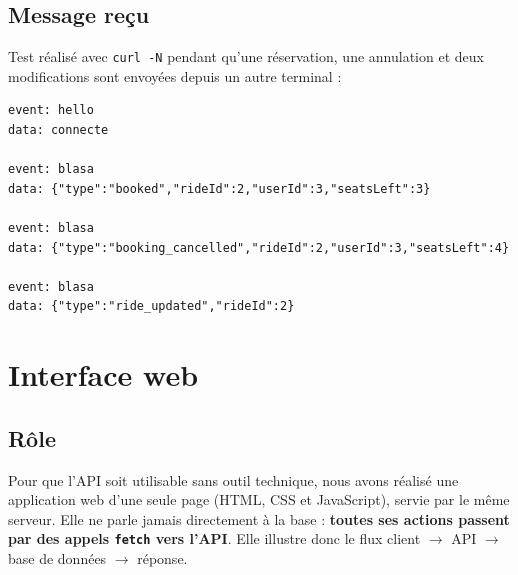 \documentclass[11pt,a4paper]{article}
\begin{document}
\subsection{Message re\c cu}
Test r\'ealis\'e avec \texttt{curl -N} pendant qu'une r\'eservation, une annulation et deux modifications sont envoy\'ees depuis un autre terminal :
\begin{lstlisting}
event: hello
data: connecte

event: blasa
data: {"type":"booked","rideId":2,"userId":3,"seatsLeft":3}

event: blasa
data: {"type":"booking_cancelled","rideId":2,"userId":3,"seatsLeft":4}

event: blasa
data: {"type":"ride_updated","rideId":2}
\end{lstlisting}

\section{Interface web}

\subsection{R\^ole}
Pour que l'API soit utilisable sans outil technique, nous avons r\'ealis\'e une application web d'une seule page (HTML, CSS et JavaScript), servie par le m\^eme serveur. Elle ne parle jamais directement \`a la base : \textbf{toutes ses actions passent par des appels \texttt{fetch} vers l'API}. Elle illustre donc le flux client $\rightarrow$ API $\rightarrow$ base de donn\'ees $\rightarrow$ r\'eponse.
\end{document}
